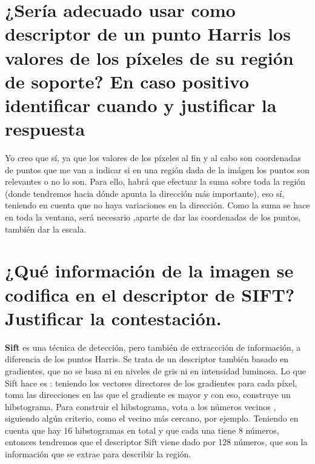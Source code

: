 \section{¿Sería adecuado usar como descriptor de un punto Harris los valores de
los píxeles de su región de soporte? En caso positivo identificar cuando y
justificar la respuesta}
Yo creo que sí, ya que los valores de los píxeles al fin y al cabo son coordenadas de puntos
que me van a indicar si en una región dada de la imágen los puntos son relevantes o no lo son.\newline
Para ello, habrá que efectuar la suma sobre toda la región (donde tendremos hacia dónde apunta la dirección
más importante), eso sí, teniendo en cuenta que no haya variaciones en la dirección. \newline
Como la suma se hace en toda la ventana, será necesario ,aparte de dar las coordenadas de los puntos,
también dar la escala.

\section{¿Qué información de la imagen se codifica en el descriptor de SIFT?
Justificar la contestación.}
\textbf{Sift} es una técnica de detección, pero también de extraccción de información, a
diferencia de los puntos Harris. Se trata de un descriptor también basado en gradientes, que no se basa ni en
niveles de gris ni en intensidad luminosa. \newline
Lo que Sift hace es : teniendo los vectores directores de los gradientes para cada píxel, toma las direcciones
en las que el gradiente es mayor y con eso, construye un hibstograma. Para construir el hibstograma, vota a los números vecinos
, siguiendo algún criterio, como el vecino más cercano, por ejemplo.\newline
Teniendo en cuenta que hay 16 hibstogramas en total y que cada una tiene 8 números,  entonces tendremos que el descriptor Sift viene dado por 128
números, que son la información que se extrae para describir la región.

